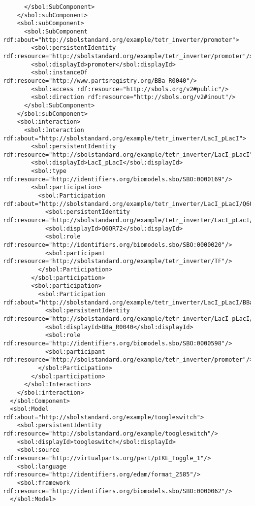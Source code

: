 \begin{lstlisting}
      </sbol:SubComponent>
    </sbol:subComponent>
    <sbol:subComponent>
      <sbol:SubComponent rdf:about="http://sbolstandard.org/example/tetr_inverter/promoter">
        <sbol:persistentIdentity rdf:resource="http://sbolstandard.org/example/tetr_inverter/promoter"/>
        <sbol:displayId>promoter</sbol:displayId>
        <sbol:instanceOf rdf:resource="http://www.partsregistry.org/BBa_R0040"/>
        <sbol:access rdf:resource="http://sbols.org/v2#public"/>
        <sbol:direction rdf:resource="http://sbols.org/v2#inout"/>
      </sbol:SubComponent>
    </sbol:subComponent>
    <sbol:interaction>
      <sbol:Interaction rdf:about="http://sbolstandard.org/example/tetr_inverter/LacI_pLacI">
        <sbol:persistentIdentity rdf:resource="http://sbolstandard.org/example/tetr_inverter/LacI_pLacI"/>
        <sbol:displayId>LacI_pLacI</sbol:displayId>
        <sbol:type rdf:resource="http://identifiers.org/biomodels.sbo/SBO:0000169"/>
        <sbol:participation>
          <sbol:Participation rdf:about="http://sbolstandard.org/example/tetr_inverter/LacI_pLacI/Q6QR72">
            <sbol:persistentIdentity rdf:resource="http://sbolstandard.org/example/tetr_inverter/LacI_pLacI/Q6QR72"/>
            <sbol:displayId>Q6QR72</sbol:displayId>
            <sbol:role rdf:resource="http://identifiers.org/biomodels.sbo/SBO:0000020"/>
            <sbol:participant rdf:resource="http://sbolstandard.org/example/tetr_inverter/TF"/>
          </sbol:Participation>
        </sbol:participation>
        <sbol:participation>
          <sbol:Participation rdf:about="http://sbolstandard.org/example/tetr_inverter/LacI_pLacI/BBa_R0040">
            <sbol:persistentIdentity rdf:resource="http://sbolstandard.org/example/tetr_inverter/LacI_pLacI/BBa_R0040"/>
            <sbol:displayId>BBa_R0040</sbol:displayId>
            <sbol:role rdf:resource="http://identifiers.org/biomodels.sbo/SBO:0000598"/>
            <sbol:participant rdf:resource="http://sbolstandard.org/example/tetr_inverter/promoter"/>
          </sbol:Participation>
        </sbol:participation>
      </sbol:Interaction>
    </sbol:interaction>
  </sbol:Component>
  <sbol:Model rdf:about="http://sbolstandard.org/example/toogleswitch">
    <sbol:persistentIdentity rdf:resource="http://sbolstandard.org/example/toogleswitch"/>
    <sbol:displayId>toogleswitch</sbol:displayId>
    <sbol:source rdf:resource="http://virtualparts.org/part/pIKE_Toggle_1"/>
    <sbol:language rdf:resource="http://identifiers.org/edam/format_2585"/>
    <sbol:framework rdf:resource="http://identifiers.org/biomodels.sbo/SBO:0000062"/>
  </sbol:Model>

\end{lstlisting}
